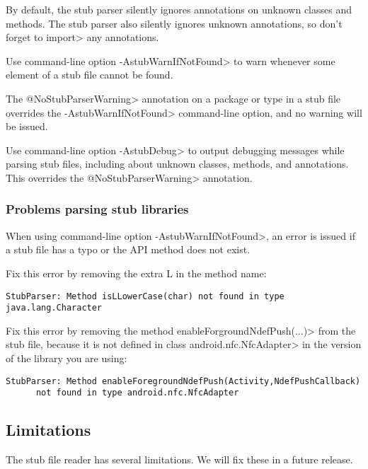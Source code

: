 By default, the stub parser silently ignores
annotations on unknown classes and methods.
The stub parser also silently ignores unknown annotations, so don't forget to
\<import> any annotations.  

Use command-line option 
\<-AstubWarnIfNotFound> to warn whenever some element of a stub file cannot
be found.

The \<@NoStubParserWarning> annotation on a package or type in a stub file
overrides the \<-AstubWarnIfNotFound> command-line option, and no warning
will be issued.

Use command-line option \<-AstubDebug> to output debugging messages while
parsing stub files, including about unknown classes, methods, and
annotations.  This overrides the \<@NoStubParserWarning> annotation.



\subsubsection{Problems parsing stub libraries}

When using command-line option \<-AstubWarnIfNotFound>,
an error is issued if a stub file has a typo or the API method does not
exist.

Fix this error by removing the extra L in the method name:
\begin{Verbatim}
StubParser: Method isLLowerCase(char) not found in type java.lang.Character
\end{Verbatim}

Fix this error by removing the method \<enableForgroundNdefPush(...)> from
the stub file, because it is not defined in class \<android.nfc.NfcAdapter>
in the version of the library you are using:
\begin{Verbatim}
StubParser: Method enableForegroundNdefPush(Activity,NdefPushCallback) 
      not found in type android.nfc.NfcAdapter
\end{Verbatim}


\subsection{Limitations\label{stub-limitations}}

The stub file reader has several limitations.  We will fix these in a
future release.

